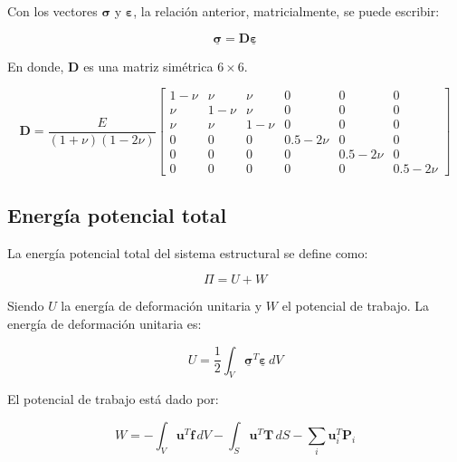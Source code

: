Con los vectores $\bm{\sigma}$ y $\bm{\varepsilon}$, la relación anterior, matricialmente, se puede escribir:

\begin{equation}
	\underline{\bm{\sigma}} = \mathbf{D} \underline{\bm{\varepsilon}}
\end{equation}

En donde, $\mathbf{D}$ es una matriz simétrica $6 \times 6$.

\begin{equation}
	\mathbf{D} = \dfrac{E}{(1+\nu)(1-2\nu)}
	\begin{bmatrix}
		1-\nu & \nu & \nu & 0 & 0 & 0 \\
		\nu & 1-\nu & \nu & 0 & 0 & 0 \\
		\nu & \nu & 1-\nu & 0 & 0 & 0 \\
		0 & 0 & 0 & 0.5-2\nu & 0 & 0 \\
		0 & 0 & 0 & 0 & 0.5-2\nu & 0 \\
		0 & 0 & 0 & 0 & 0 & 0.5-2\nu
	\end{bmatrix}
\end{equation}


\subsection{Energía potencial total}

La energía potencial total del sistema estructural se define como:

\begin{equation}
	\Pi = U + W
	\label{eq:EP}
\end{equation}

Siendo $U$ la energía de deformación unitaria y $W$ el potencial de trabajo. La energía de deformación unitaria es:

\begin{equation}
	U = \dfrac{1}{2} \int_V \underline{\bm{\sigma}}^T \underline{\bm{\varepsilon}} \, dV
\end{equation}

El potencial de trabajo está dado por:

\begin{equation}
	W = -\int_V \mathbf{u}^T \mathbf{f} \, dV - \int_S \mathbf{u}^T \mathbf{T} \, dS - \sum_i \mathbf{u}^T_i \mathbf{P}_i
\end{equation}



